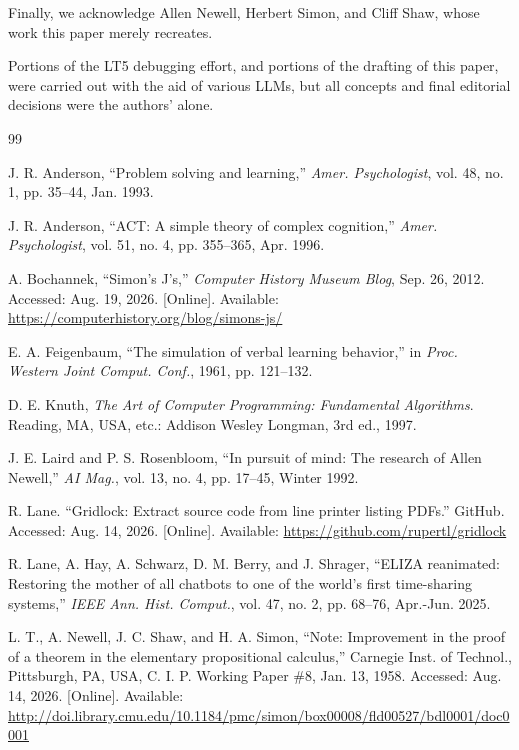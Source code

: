 \documentclass{IEEEcsmag}
\begin{document}
Finally, we acknowledge Allen Newell, Herbert Simon, and Cliff Shaw,
whose work this paper merely recreates.

{\footnotesize Portions of the LT5 debugging effort, and portions of
the drafting of this paper, were carried out with the aid of various
LLMs, but all concepts and final editorial decisions were the
authors' alone.}

\begin{thebibliography}{99}

 J. R. Anderson, ``Problem solving and learning,''
  \textit{Amer. Psychologist}, vol. 48, no. 1, pp. 35--44, Jan. 1993.

 J. R. Anderson, ``ACT: A simple theory of
  complex cognition,'' \textit{Amer. Psychologist}, vol. 51, no. 4,
  pp. 355--365, Apr. 1996.

 A. Bochannek, ``Simon's J's,''
  \textit{Computer History Museum Blog}, Sep. 26, 2012.
  Accessed: Aug. 19, 2026.  [Online].
  Available: \url{https://computerhistory.org/blog/simons-js/}

 E. A. Feigenbaum, ``The simulation of
  verbal learning behavior,'' in \textit{Proc. Western Joint
  Comput. Conf.}, 1961, pp. 121--132.

 D. E. Knuth,
  \textit{The Art of Computer Programming: Fundamental Algorithms}.
  Reading, MA, USA, etc.: Addison Wesley Longman, 3rd ed., 1997.

 J. E. Laird and P. S. Rosenbloom,
  ``In pursuit of mind: The research of Allen Newell,''
  \textit{AI Mag.}, vol. 13, no. 4, pp. 17--45, Winter 1992.

 R. Lane. ``Gridlock: Extract
  source code from line printer listing PDFs.'' GitHub.
  Accessed: Aug. 14, 2026.  [Online].
  Available: \url{https://github.com/rupertl/gridlock}

 R. Lane, A. Hay, A. Schwarz, D. M. Berry, and
  J. Shrager, ``ELIZA reanimated: Restoring the mother of all chatbots
  to one of the world's first time-sharing systems,'' \textit{IEEE
  Ann. Hist. Comput.}, vol. 47, no. 2, pp. 68--76, Apr.-Jun. 2025.

 L. T., A. Newell, J. C. Shaw, and H. A. Simon,
  ``Note: Improvement in the proof of a theorem in the elementary
  propositional calculus,''
  Carnegie Inst. of Technol., Pittsburgh, PA, USA,
  C. I. P. Working Paper \#8, Jan. 13, 1958.
  Accessed: Aug. 14, 2026.  [Online].
  Available: \url{http://doi.library.cmu.edu/10.1184/pmc/simon/box00008/fld00527/bdl0001/doc0001}


\end{thebibliography}
\end{document}
